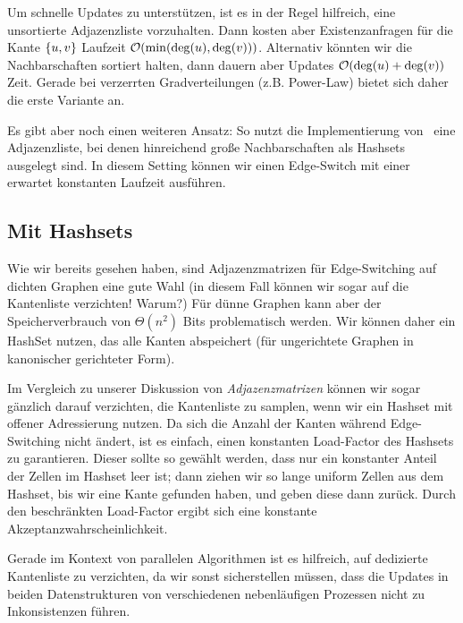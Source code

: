 Um schnelle Updates zu unterstützen, ist es in der Regel hilfreich, eine unsortierte Adjazenzliste vorzuhalten.
Dann kosten aber Existenzanfragen für die Kante $\left\{u,v\right\}$ Laufzeit $\mathcal{O}\!\left(\min(\deg(u), \deg(v))\right)$.
Alternativ könnten wir die Nachbarschaften sortiert halten, dann dauern aber Updates $\mathcal{O}\!\left(\deg(u) + \deg(v)\right)$ Zeit.
Gerade bei verzerrten Gradverteilungen (z.B. Power-Law) bietet sich daher die erste Variante an.

Es gibt aber noch einen weiteren Ansatz: So nutzt die Implementierung von~\cite{DBLP:journals/compnet/VigerL16} eine Adjazenzliste, bei denen hinreichend große Nachbarschaften als Hashsets ausgelegt sind.
In diesem Setting können wir einen Edge-Switch mit einer erwartet konstanten Laufzeit ausführen.

\subsection{Mit Hashsets}
Wie wir bereits gesehen haben, sind Adjazenzmatrizen für Edge-Switching auf dichten Graphen eine gute Wahl (in diesem Fall können wir sogar auf die Kantenliste verzichten! Warum?)
Für dünne Graphen kann aber der Speicherverbrauch von $\Theta(n^2)$ Bits problematisch werden.
Wir können daher ein HashSet nutzen, das alle Kanten abspeichert (für ungerichtete Graphen in kanonischer gerichteter Form).

Im Vergleich zu unserer Diskussion von \emph{Adjazenzmatrizen} können wir sogar gänzlich darauf verzichten, die Kantenliste zu samplen, wenn wir ein Hashset mit offener Adressierung nutzen.
Da sich die Anzahl der Kanten während Edge-Switching nicht ändert, ist es einfach, einen konstanten Load-Factor des Hashsets zu garantieren.
Dieser sollte so gewählt werden, dass nur ein konstanter Anteil der Zellen im Hashset leer ist;
dann ziehen wir so lange uniform Zellen aus dem Hashset, bis wir eine Kante gefunden haben, und geben diese dann zurück.
Durch den beschränkten Load-Factor ergibt sich eine konstante Akzeptanzwahrscheinlichkeit.

Gerade im Kontext von parallelen Algorithmen ist es hilfreich, auf dedizierte Kantenliste zu verzichten, da wir sonst sicherstellen müssen, dass die Updates in beiden Datenstrukturen von verschiedenen nebenläufigen Prozessen nicht zu Inkonsistenzen führen.



